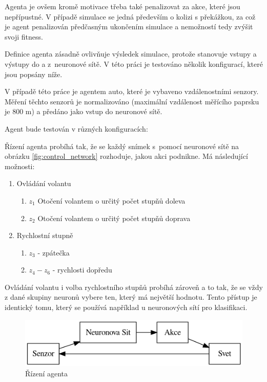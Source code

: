 \label{sec:fitness}

Agenta je ovšem kromě motivace třeba také penalizovat za akce, které jsou nepřípustné. V případě simulace se jedná především o kolizi s překážkou, za což je agent penalizován předčasným ukončením simulace a nemožností tedy zvýšit svoji fitness.

Definice agenta zásadně ovlivňuje výsledek simulace, protože stanovuje vstupy a výstupy do a z~neuronové sítě. V této práci je testováno několik konfigurací, které jsou popsány níže.

V případě této práce je agentem auto, které je vybaveno vzdálenostními senzory. Měření těchto senzorů je normalizováno (maximální vzdálenost měřícího paprsku je 800 m) a předáno jako vstup do neuronové sítě.

Agent bude testován v různých konfiguracích: 



Řízení agenta probíhá tak, že se každý snímek s~pomocí neuronové sítě na obrázku \ref{fig:control_network} rozhoduje, jakou akci podnikne. Má následující možnosti:

\begin{enumerate}
	\item Ovládání volantu 
	\begin{enumerate}
		\item $z_1$ Otočení volantem o určitý počet stupňů doleva
		\item $z_2$ Otočení volantem o určitý počet stupňů doprava
	\end{enumerate} 
	\item Rychlostní stupně
	\begin{enumerate}
		\item $z_3$ - zpátečka
		\item $z_4 - z_6$ - rychlosti dopředu
	\end{enumerate}
\end{enumerate}

Ovládání volantu i volba rychlostního stupňů probíhá zároveň a to tak, že se vždy z dané skupiny neuronů vybere ten, který má největší hodnotu. Tento přístup je identický tomu, který se používá například u neuronových sítí pro klasifikaci.

\begin{figure}[H]
	\centering
	\includegraphics[width=0.7\linewidth]{AgentSchema}
	\caption{Řízení agenta}
	\label{fig:agentschema}
\end{figure}

